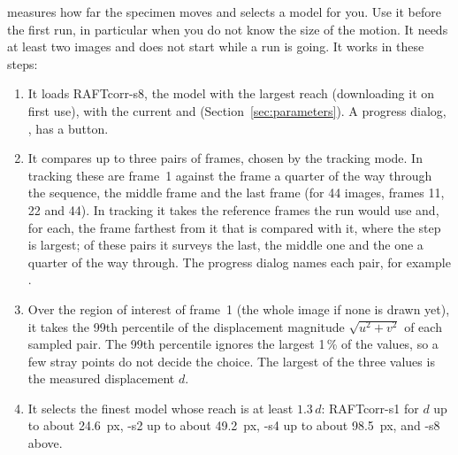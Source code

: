  measures how far the specimen moves and selects a model for you. Use it
before the first run, in particular when you do not know the size of the motion. It needs at
least two images and does not start while a run is going. It works in these steps:
\begin{enumerate}
  \item It loads RAFTcorr-s8, the model with the largest reach (downloading it on first use),
        with the current  and  (Section~\ref{sec:parameters}). A
        progress dialog, , has a  button.
  \item It compares up to three pairs of frames, chosen by the tracking mode. In
         tracking these are frame~1 against the frame a quarter of the way
        through the sequence, the middle frame and the last frame (for 44 images, frames 11, 22
        and 44). In  tracking it takes the reference frames the run would use and,
        for each, the frame farthest from it that is compared with it, where the step is
        largest; of these pairs it surveys the last, the middle one and the one a quarter of the
        way through. The progress dialog names each pair, for example .
  \item Over the region of interest of frame~1 (the whole image if none is drawn yet), it takes
        the 99th percentile of the displacement magnitude $\sqrt{u^2 + v^2}$ of each sampled
        pair. The 99th percentile ignores the largest 1\,\% of the values, so a few stray points
        do not decide the choice. The largest of the three values is the measured displacement
        $d$.
  \item It selects the finest model whose reach is at least $1.3\,d$: RAFTcorr-s1 for $d$ up to
        about 24.6~px, -s2 up to about 49.2~px, -s4 up to about 98.5~px, and -s8 above.
\end{enumerate}

